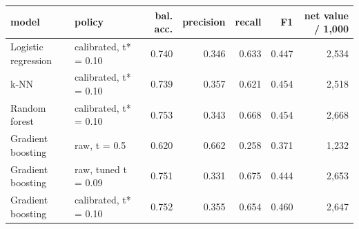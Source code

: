 \begin{tabular}{llrrrrr}
\toprule
model & policy & bal. acc. & precision & recall & F1 & net value / 1,000 \\
\midrule
Logistic regression & calibrated, t* = 0.10 & 0.740 & 0.346 & 0.633 & 0.447 & 2,534 \\
k-NN & calibrated, t* = 0.10 & 0.739 & 0.357 & 0.621 & 0.454 & 2,518 \\
Random forest & calibrated, t* = 0.10 & 0.753 & 0.343 & 0.668 & 0.454 & 2,668 \\
Gradient boosting & raw, t = 0.5 & 0.620 & 0.662 & 0.258 & 0.371 & 1,232 \\
Gradient boosting & raw, tuned t = 0.09 & 0.751 & 0.331 & 0.675 & 0.444 & 2,653 \\
Gradient boosting & calibrated, t* = 0.10 & 0.752 & 0.355 & 0.654 & 0.460 & 2,647 \\
\bottomrule
\end{tabular}